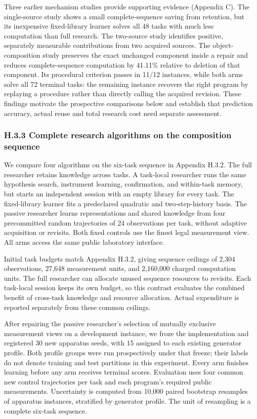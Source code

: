 \documentclass[twoside,11pt]{article}
\begin{document}
Three earlier mechanism studies provide supporting evidence (Appendix C). The single-source study shows a small complete-sequence saving from retention, but its inexpensive fixed-library learner solves all 48 tasks with much less computation than full research. The two-source study identifies positive, separately measurable contributions from two acquired sources. The object-composition study preserves the exact unchanged component inside a repair and reduces complete-sequence computation by 41.11\% relative to deletion of that component. Its procedural criterion passes in 11/12 instances, while both arms solve all 72 terminal tasks: the remaining instance recovers the right program by replaying a procedure rather than directly calling the acquired revision. These findings motivate the prospective comparisons below and establish that prediction accuracy, actual reuse and total research cost need separate assessment.


\subsubsection*{H.3.3 Complete research algorithms on the composition sequence}

We compare four algorithms on the six-task sequence in Appendix H.3.2. The full researcher retains knowledge across tasks. A task-local researcher runs the same hypothesis search, instrument learning, confirmation, and within-task memory, but starts an independent session with an empty library for every task. The fixed-library learner fits a predeclared quadratic and two-step-history basis. The passive researcher learns representations and shared knowledge from four precommitted random trajectories of 24 observations per task, without adaptive acquisition or revisits. Both fixed controls use the finest legal measurement view. All arms access the same public laboratory interface.


Initial task budgets match Appendix H.3.2, giving sequence ceilings of 2,304 observations, 27,648 measurement units, and 2,160,000 charged computation units. The full researcher can allocate unused sequence resources to revisits. Each task-local session keeps its own budget, so this contrast evaluates the combined benefit of cross-task knowledge and resource allocation. Actual expenditure is reported separately from these common ceilings.


After repairing the passive researcher's selection of mutually exclusive measurement views on a development instance, we froze the implementation and registered 30 new apparatus seeds, with 15 assigned to each existing generator profile. Both profile groups were run prospectively under that freeze; their labels do not denote training and test partitions in this experiment. Every arm finishes learning before any arm receives terminal scores. Evaluation uses four common new control trajectories per task and each program's required public measurements. Uncertainty is computed from 10,000 paired bootstrap resamples of apparatus instances, stratified by generator profile. The unit of resampling is a complete six-task sequence.
\end{document}
